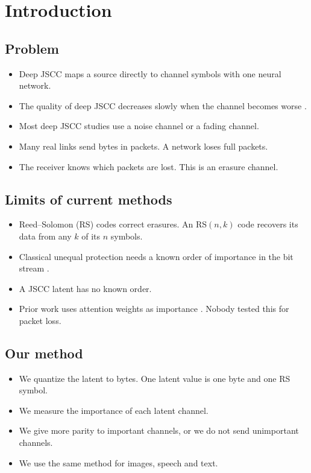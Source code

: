 \documentclass[journal]{IEEEtran}
\begin{document}
\section{Introduction}
\subsection*{Problem}
\begin{itemize}
\item Deep JSCC maps a source directly to channel symbols with one neural network.
\item The quality of deep JSCC decreases slowly when the channel becomes worse \cite{bourtsoulatze2019deep}.
\item Most deep JSCC studies use a noise channel or a fading channel.
\item Many real links send bytes in packets. A network loses full packets.
\item The receiver knows which packets are lost. This is an erasure channel.
\end{itemize}
\subsection*{Limits of current methods}
\begin{itemize}
\item Reed--Solomon (RS) codes correct erasures. An RS$(n,k)$ code recovers its data from any $k$ of its $n$ symbols.
\item Classical unequal protection needs a known order of importance in the bit stream \cite{albanese1996pet,mohr2000ulp}.
\item A JSCC latent has no known order.
\item Prior work uses attention weights as importance \cite{uyanik2023gradfec,zhan2026isfr}. Nobody tested this for packet loss.
\end{itemize}
\subsection*{Our method}
\begin{itemize}
\item We quantize the latent to bytes. One latent value is one byte and one RS symbol.
\item We measure the importance of each latent channel.
\item We give more parity to important channels, or we do not send unimportant channels.
\item We use the same method for images, speech and text.
\end{itemize}
\end{document}
